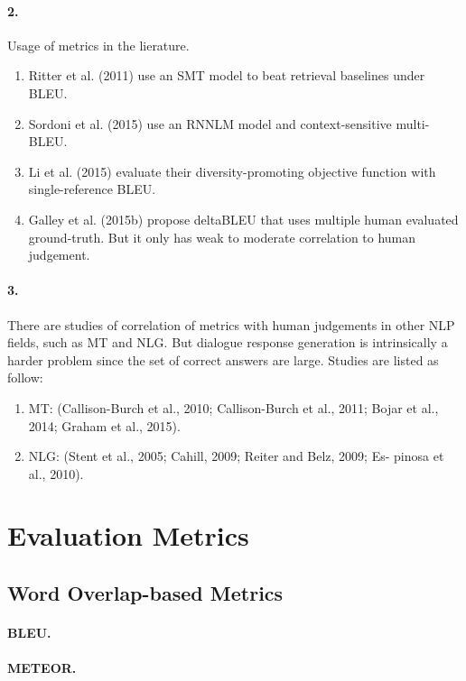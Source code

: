 \documentclass[runningheads]{llncs}
\begin{document}
\paragraph{2.} Usage of metrics in the lierature.
\begin{enumerate}
    \item Ritter et al. (2011) use an SMT model to beat retrieval baselines
    under BLEU.
    \item Sordoni et al. (2015) use an RNNLM model and context-sensitive multi-BLEU.
    \item Li et al. (2015) evaluate their diversity-promoting objective function
    with single-reference BLEU.
    \item Galley et al. (2015b) propose deltaBLEU that uses multiple human evaluated
    ground-truth. But it only has weak to moderate correlation to human judgement.
\end{enumerate}

\paragraph{3.} There are studies
of correlation of metrics with human judgements in other NLP fields,
such as MT and NLG. But dialogue response generation is intrinsically
a harder problem since the set of correct answers are large.
Studies are listed as follow:
\begin{enumerate}
    \item MT: (Callison-Burch et al., 2010; Callison-Burch et al.,
2011; Bojar et al., 2014; Graham et al., 2015).
    \item NLG: (Stent et
al., 2005; Cahill, 2009; Reiter and Belz, 2009; Es-
pinosa et al., 2010).
\end{enumerate}

\section{Evaluation Metrics}
\subsection{Word Overlap-based Metrics}
\paragraph{BLEU.}
\paragraph{METEOR.}
\end{document}
